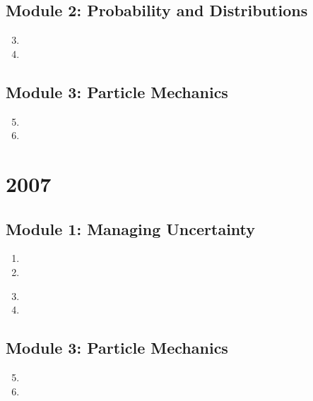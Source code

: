 \documentclass[fleqn,titlepage]{book}
\numberwithin{equation}{section}
\theoremstyle{plain}
\theoremstyle{definition}
\theoremstyle{remark}
\begin{document}
\section{Module 2: Probability and Distributions}
\begin{enumerate}[label=\bfseries  \arabic*.]\setcounter{enumi}{2}
\item 
\item 
\end{enumerate}
\section{Module 3: Particle Mechanics}
\begin{enumerate}[label=\bfseries  \arabic*.]\setcounter{enumi}{4}
\item 
\item 
\end{enumerate}

\chapter{2007}
\section{Module 1: Managing Uncertainty}
\begin{enumerate}[label=\bfseries  \arabic*.]\setcounter{enumi}{0}
\item 
\item 
\end{enumerate}
\begin{enumerate}[label=\bfseries  \arabic*.]\setcounter{enumi}{2}
\section{Module 2: Probability and Distributions}
\item 
\item 
\end{enumerate}
\section{Module 3: Particle Mechanics}
\begin{enumerate}[label=\bfseries  \arabic*.]\setcounter{enumi}{4}
\item 
\item 
\end{enumerate}
\end{document}
